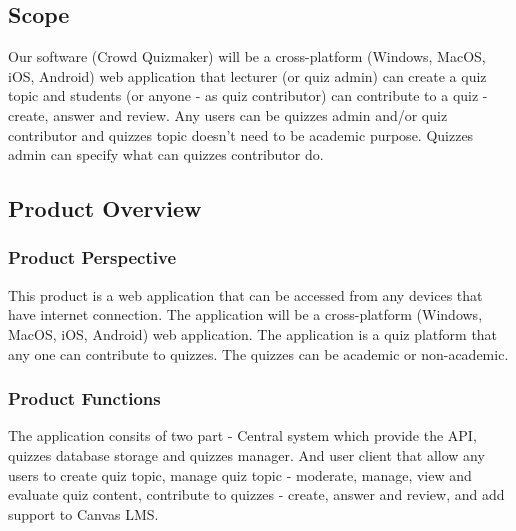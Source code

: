 \documentclass[ 10pt]{report}
\begin{document}
        \subsection{Scope}
        Our software (Crowd Quizmaker) will be a cross-platform (Windows, MacOS, iOS, Android) web application that lecturer (or quiz admin) can create a quiz topic and students (or anyone - as quiz contributor) can contribute to a quiz - create, answer and review. Any users can be quizzes admin and/or quiz contributor and quizzes topic doesn't need to be academic purpose. Quizzes admin can specify what can quizzes contributor do.
        \subsection{Product Overview}
            \subsubsection{Product Perspective}
            This product is a web application that can be accessed from any devices that have internet connection. The application will be a cross-platform (Windows, MacOS, iOS, Android) web application. The application is a quiz platform that any one can contribute to quizzes. The quizzes can be academic or non-academic.
            \subsubsection{Product Functions}
            The application consits of two part - Central system which provide the API, quizzes database storage and quizzes manager. And user client that allow any users to create quiz topic, manage quiz topic - moderate, manage, view and evaluate quiz content, contribute to quizzes - create, answer and review, and add support to Canvas LMS.
\end{document}

